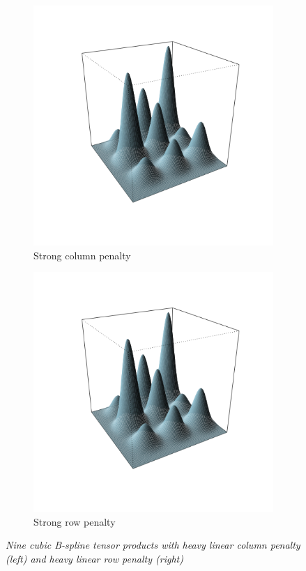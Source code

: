 \documentclass[12pt]{article}
\theoremstyle{definition}
\begin{document}
\begin{center}
\begin{figure}[H] \label{row-col-differencing}
 \begin{subfigure}{.48\textwidth}
 \includegraphics{img/large-row-penalty.png}
 \caption{Strong column penalty}
 \label{fig:strong-col-penalty}
 \end{subfigure}
 \begin{subfigure}{.48\textwidth}
  \includegraphics{img/large-row-penalty.png}
 \caption{Strong row penalty}
\label{fig:strong-row-penalty}
 \end{subfigure}
 \caption{\textit{Nine cubic B-spline tensor products with heavy linear column penalty (left) and heavy linear row penalty (right)}}
\end{figure}
\end{center}
\end{document}
